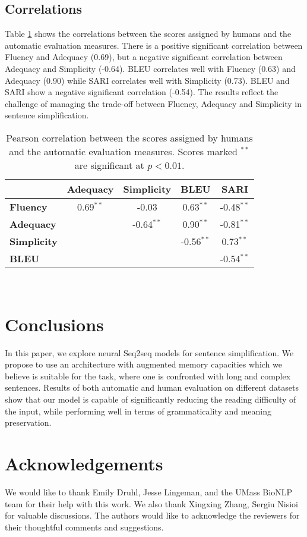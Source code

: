 \documentclass[11pt,a4paper]{article}
\begin{document}
\subsection{Correlations}
Table \ref{tbl5} shows the correlations between the scores assigned by humans and the automatic evaluation measures. There is a positive significant correlation between Fluency and Adequacy (0.69), but a negative significant correlation between Adequacy and Simplicity (-0.64). BLEU correlates well with Fluency (0.63) and Adequacy (0.90) while SARI correlates well with Simplicity (0.73). BLEU and SARI show a negative significant correlation (-0.54). The results reflect the challenge of managing the trade-off between Fluency, Adequacy and Simplicity in sentence simplification. \begin{table}[h!]
\centering
\begin{adjustbox}{max width=0.45\textwidth}
\begin{tabular}{| l | c c c c |} 
 \hline
 & \textbf{Adequacy} & \textbf{Simplicity} & \textbf{BLEU} & \textbf{SARI}\\
  \hline
   \hline
 \textbf{Fluency} & 0.69$^{**}$ & -0.03 & 0.63$^{**}$ & -0.48$^{**}$\\
 \textbf{Adequacy} & & -0.64$^{**}$ & 0.90$^{**}$ & -0.81$^{**}$\\
 \textbf{Simplicity} & & & -0.56$^{**}$ & 0.73$^{**}$\\
 \textbf{BLEU} & & & & -0.54$^{**}$\\
 
  \hline
\end{tabular}\end{adjustbox}
\\[3mm]
\caption{Pearson correlation between the scores assigned by humans and the automatic evaluation measures. Scores marked $^{**}$ are significant at $p < 0.01.$}
\label{tbl5}
\vspace*{-3mm}
\end{table}

\section{Conclusions}
In this paper, we explore neural Seq2seq models for sentence simplification. We propose to use an architecture with augmented memory capacities which we believe is suitable for the task, where one is confronted with long and complex sentences. Results of both automatic and human evaluation on different datasets show that our model is capable of significantly reducing the reading difficulty of the input, while performing well in terms of grammaticality and meaning preservation.


\section{Acknowledgements}
We would like to thank Emily Druhl, Jesse Lingeman, and the UMass BioNLP team for their help with this work. We also thank Xingxing Zhang, Sergiu Nisioi for valuable discussions. The authors would like to acknowledge the reviewers for their thoughtful comments and suggestions.


\end{document}
